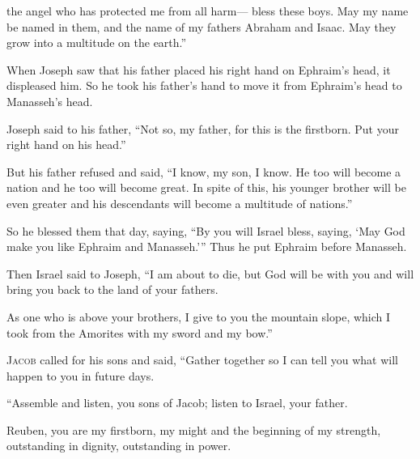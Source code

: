 \begin{scripture}
 the angel who has protected me from all harm--- bless these boys. May my name be named in them, and the name of my fathers Abraham and Isaac. May they grow into a multitude on the earth.''
\everypar{}

 When Joseph saw that his father placed his right hand on Ephraim's head, it displeased him. So he took his father's hand to move it from Ephraim's head to Manasseh's head.
 Joseph said to his father, ``Not so, my father, for this is the firstborn. Put your right hand on his head.''
\everypar{}

 But his father refused and said, ``I know, my son, I know. He too will become a nation and he too will become great. In spite of this, his younger brother will be even greater and his descendants will become a multitude of nations.''
\everypar{}

 So he blessed them that day, saying, ``By you will Israel bless, saying, `May God make you like Ephraim and Manasseh.''' Thus he put Ephraim before Manasseh.
\everypar{}

 Then Israel said to Joseph, ``I am about to die, but God will be with you and will bring you back to the land of your fathers.
 As one who is above your brothers, I give to you the mountain slope, which I took from the Amorites with my sword and my bow.''

 \allowchapbreak\hypertarget{ch-genesis-49}{}\lettrine[lines=5]{\color{pentateuch}J}{\textsc{acob}} called for his sons and said, ``Gather together so I can tell you what will happen to you in future days.\everypar{}
\\\indent{} ``Assemble and listen, you sons of Jacob; listen to Israel, your father.
\\\indent{} Reuben, you are my firstborn, my might and the beginning of my strength, outstanding in dignity, outstanding in power.
\everypar{}


\end{scripture}
